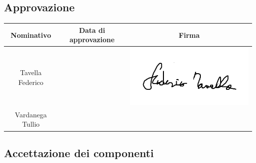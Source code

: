 \documentclass[PianoProgetto.tex]{subfiles}
\begin{document}
\begin{appendices}
\begin{table}[h]
	\end{table}
	
\vfill
	
	\subsection{Approvazione}
	
		\begin{table}[h]

	
		\begin{tabularx}{\textwidth}{C C C}
			\toprule
			\textbf{Nominativo} & \textbf{Data di approvazione} & \textbf{Firma} \\
			\midrule
			Tavella Federico &  & \includegraphics[scale=0.3, trim=0 2cm 0 0.3cm]{firme_componenti/ftavella_firma} \\[1ex]
			\midrule
			Vardanega Tullio &  &  \\[1ex]
			\bottomrule
		\end{tabularx}
		
	\end{table}	
\vfill	
\newpage
\vfill	
	\subsection{Accettazione dei componenti}
	
		\begin{table}[h]
	

\end{table}
\end{appendices}
\end{document}
